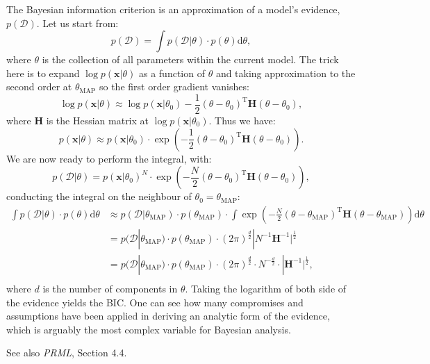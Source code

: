 \documentclass[UTF8]{ctexart}
\begin{document}
The Bayesian information criterion is an approximation of a model's evidence, $p(\mathcal{D})$.
Let us start from:
$$p(\mathcal{D})=\int p(\mathcal{D}|\theta)\cdot p(\theta)\text{d}\theta,$$
where $\theta$ is the collection of all parameters within the current model.
The trick here is to expand $\log p(\textbf{x}|\theta)$ as a function of $\theta$ and taking approximation to the second order at $\theta_{\text{MAP}}$ so the first order gradient vanishes:
$$\log p(\textbf{x}|\theta)\approx \log p(\textbf{x}|\theta_{0})-\frac{1}{2}(\theta-\theta_{0})^{\text{T}} \textbf{H}(\theta-\theta_{0}),$$
where $\textbf{H}$ is the Hessian matrix at $\log p(\textbf{x}|\theta_{0})$.
Thus we have:
$$p(\textbf{x}|\theta)\approx p(\textbf{x}|\theta_{0})\cdot\exp\left(-\frac{1}{2}(\theta-\theta_{0})^{\text{T}} \textbf{H}(\theta-\theta_{0}) \right).$$
We are now ready to perform the integral, with:
$$p(\mathcal{D}|\theta)=p(\textbf{x}|\theta_{0})^{N}\cdot\exp\left(-\frac{N}{2}(\theta-\theta_{0})^{\text{T}}\textbf{H}(\theta-\theta_{0}) \right),$$
conducting the integral on the neighbour of $\theta_{0}=\theta_{\text{MAP}}$:
$$
\begin{aligned}
\int p(\mathcal{D}|\theta)\cdot p(\theta)\text{d}\theta&\approx p(\mathcal{D}|\theta_{\text{MAP}})\cdot p(\theta_{\text{MAP}})\cdot \int \exp\left(-\frac{N}{2}(\theta-\theta_{\text{MAP}})^{\text{T}}\textbf{H}(\theta-\theta_{\text{MAP}}) \right)\text{d}\theta \\
&=p(\mathcal{D}|\theta_{\text{MAP}})\cdot p(\theta_{\text{MAP}})\cdot (2\pi)^{\frac{d}{2}}|N^{-1}\textbf{H}^{-1}|^{\frac{1}{2}}\\
&=p(\mathcal{D}|\theta_{\text{MAP}})\cdot p(\theta_{\text{MAP}})\cdot (2\pi)^{\frac{d}{2}}\cdot N^{-\frac{d}{2}}\cdot |\textbf{H}^{-1}|^{\frac{1}{2}},\\
\end{aligned}
$$
where $d$ is the number of components in $\theta$.
Taking the logarithm of both side of the evidence yields the BIC.
One can see how many compromises and assumptions have been applied in deriving an analytic form of the evidence, which is arguably the most complex variable for Bayesian analysis.

See also \emph{PRML}, Section 4.4.
\end{document}
